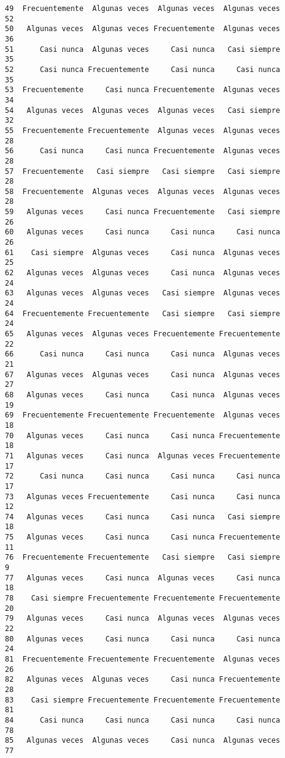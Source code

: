 \documentclass[
  letterpaper,
  DIV=11,
  numbers=noendperiod]{scrartcl}
\begin{document}
\begin{verbatim}
49  Frecuentemente  Algunas veces  Algunas veces  Algunas veces      52
50   Algunas veces  Algunas veces Frecuentemente  Algunas veces      36
51      Casi nunca  Algunas veces     Casi nunca   Casi siempre      35
52      Casi nunca Frecuentemente     Casi nunca     Casi nunca      35
53  Frecuentemente     Casi nunca Frecuentemente  Algunas veces      34
54   Algunas veces  Algunas veces  Algunas veces   Casi siempre      32
55  Frecuentemente Frecuentemente  Algunas veces  Algunas veces      28
56      Casi nunca     Casi nunca Frecuentemente  Algunas veces      28
57  Frecuentemente   Casi siempre   Casi siempre   Casi siempre      28
58  Frecuentemente  Algunas veces  Algunas veces  Algunas veces      28
59   Algunas veces     Casi nunca Frecuentemente   Casi siempre      26
60   Algunas veces     Casi nunca     Casi nunca     Casi nunca      26
61    Casi siempre  Algunas veces     Casi nunca  Algunas veces      25
62   Algunas veces  Algunas veces     Casi nunca  Algunas veces      24
63   Algunas veces  Algunas veces   Casi siempre  Algunas veces      24
64  Frecuentemente Frecuentemente   Casi siempre   Casi siempre      24
65   Algunas veces  Algunas veces Frecuentemente Frecuentemente      22
66      Casi nunca     Casi nunca     Casi nunca  Algunas veces      21
67   Algunas veces  Algunas veces     Casi nunca  Algunas veces      27
68   Algunas veces     Casi nunca     Casi nunca  Algunas veces      19
69  Frecuentemente Frecuentemente Frecuentemente  Algunas veces      18
70   Algunas veces     Casi nunca     Casi nunca Frecuentemente      18
71   Algunas veces     Casi nunca  Algunas veces Frecuentemente      17
72      Casi nunca     Casi nunca     Casi nunca     Casi nunca      17
73   Algunas veces Frecuentemente     Casi nunca     Casi nunca      12
74   Algunas veces     Casi nunca     Casi nunca   Casi siempre      18
75   Algunas veces     Casi nunca     Casi nunca Frecuentemente      11
76  Frecuentemente Frecuentemente   Casi siempre   Casi siempre       9
77   Algunas veces     Casi nunca  Algunas veces     Casi nunca      18
78    Casi siempre Frecuentemente Frecuentemente Frecuentemente      20
79   Algunas veces     Casi nunca  Algunas veces  Algunas veces      22
80   Algunas veces     Casi nunca     Casi nunca     Casi nunca      24
81  Frecuentemente Frecuentemente Frecuentemente  Algunas veces      26
82   Algunas veces  Algunas veces     Casi nunca Frecuentemente      28
83    Casi siempre Frecuentemente Frecuentemente Frecuentemente      81
84      Casi nunca     Casi nunca     Casi nunca     Casi nunca      78
85   Algunas veces  Algunas veces     Casi nunca  Algunas veces      77

\end{verbatim}
\end{document}

